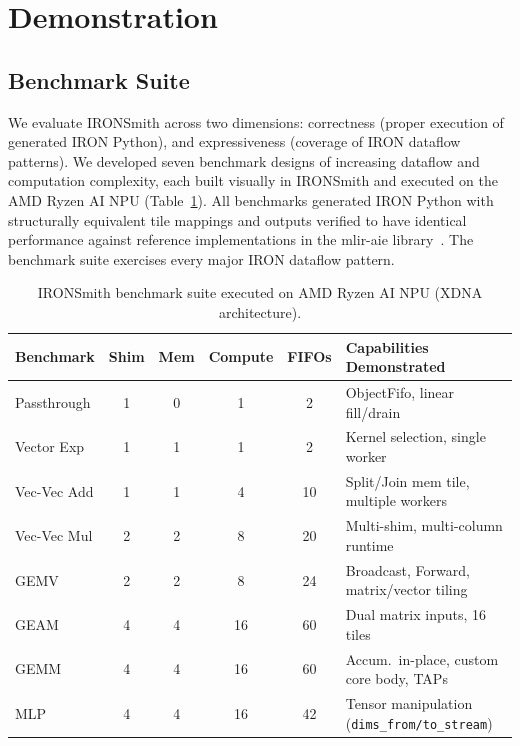 \section{Demonstration} \label{sec:methodology}
\vspace{-3mm}

\subsection{Benchmark Suite}
\vspace{-3mm}

We evaluate IRONSmith across two dimensions: correctness (proper execution of generated IRON Python), and expressiveness (coverage of IRON dataflow patterns). We developed seven benchmark designs of increasing dataflow and computation complexity, each built visually in IRONSmith and executed on the AMD Ryzen AI NPU (Table~\ref{tab:benchmarks}).
All benchmarks generated IRON Python with structurally equivalent tile mappings and outputs verified to have identical performance against reference implementations in the mlir-aie library~\cite{mliraie}.  The benchmark suite exercises every major IRON dataflow pattern.

\vspace{-2mm}
\begin{table}[h]
\centering
\caption{IRONSmith benchmark suite executed on AMD Ryzen AI NPU (XDNA architecture).}
\label{tab:benchmarks}
\small
\begin{tabular}{lccccl}
\hline
\textbf{Benchmark} & \textbf{Shim} & \textbf{Mem} & \textbf{Compute} & \textbf{FIFOs} & \textbf{Capabilities Demonstrated} \\
\hline
Passthrough   & 1 & 0 & 1  & 2  & ObjectFifo, linear fill/drain \\
Vector Exp    & 1 & 1 & 1  & 2  & Kernel selection, single worker \\
Vec-Vec Add   & 1 & 1 & 4  & 10 & Split/Join mem tile, multiple workers \\
Vec-Vec Mul   & 2 & 2 & 8  & 20 & Multi-shim, multi-column runtime \\
GEMV          & 2 & 2 & 8  & 24 & Broadcast, Forward, matrix/vector tiling \\
GEAM          & 4 & 4 & 16 & 60 & Dual matrix inputs, 16 tiles \\
GEMM          & 4 & 4 & 16 & 60 & Accum.\ in-place, custom core body, TAPs \\
\hline
MLP           & 4 & 4 & 16 & 42 & Tensor manipulation (\texttt{dims\_from/to\_stream}) \\
\hline
\end{tabular}
\vspace{-5mm}
\end{table}
\vspace{-1mm}

